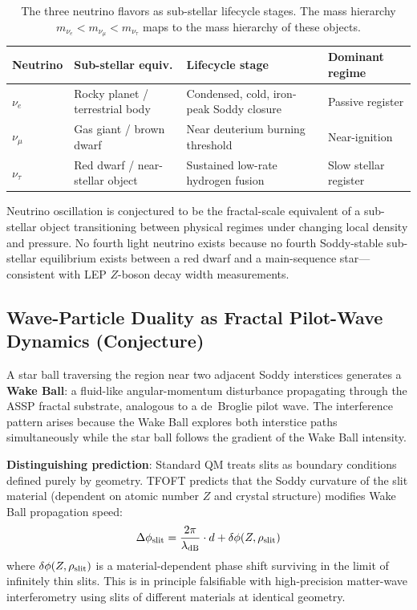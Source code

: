\documentclass[11pt,a4paper]{article}
\begin{document}
\begin{table}[h]
\centering
\begin{tabular}{|l|p{3cm}|p{3cm}|p{2.8cm}|}
\hline
\textbf{Neutrino} & \textbf{Sub-stellar equiv.} & \textbf{Lifecycle stage}
  & \textbf{Dominant regime} \\
\hline
$\nu_e$    & Rocky planet / terrestrial body
           & Condensed, cold, iron-peak Soddy closure
           & Passive register \\
\hline
$\nu_\mu$  & Gas giant / brown dwarf
           & Near deuterium burning threshold
           & Near-ignition \\
\hline
$\nu_\tau$ & Red dwarf / near-stellar object
           & Sustained low-rate hydrogen fusion
           & Slow stellar register \\
\hline
\end{tabular}
\caption{The three neutrino flavors as sub-stellar lifecycle stages. The mass hierarchy $m_{\nu_e} < m_{\nu_\mu} < m_{\nu_\tau}$ maps to the mass hierarchy of these objects.}
\end{table}

Neutrino oscillation is conjectured to be the fractal-scale equivalent of a sub-stellar object transitioning between physical regimes under changing local density and pressure. No fourth light neutrino exists because no fourth Soddy-stable sub-stellar equilibrium exists between a red dwarf and a main-sequence star---consistent with LEP $Z$-boson decay width measurements.

\subsection{Wave-Particle Duality as Fractal Pilot-Wave Dynamics (Conjecture)}

A star ball traversing the region near two adjacent Soddy interstices generates a \textbf{Wake Ball}: a fluid-like angular-momentum disturbance propagating through the ASSP fractal substrate, analogous to a de~Broglie pilot wave. The interference pattern arises because the Wake Ball explores both interstice paths simultaneously while the star ball follows the gradient of the Wake Ball intensity.

\textbf{Distinguishing prediction}: Standard QM treats slits as boundary conditions defined purely by geometry. TFOFT predicts that the Soddy curvature of the slit material (dependent on atomic number $Z$ and crystal structure) modifies Wake Ball propagation speed:
\[
\Delta\phi_{\rm slit} = \frac{2\pi}{\lambda_{\rm dB}} \cdot d
  + \delta\phi(Z, \rho_{\rm slit})
\]
where $\delta\phi(Z, \rho_{\rm slit})$ is a material-dependent phase shift surviving in the limit of infinitely thin slits. This is in principle falsifiable with high-precision matter-wave interferometry using slits of different materials at identical geometry.
\end{document}
